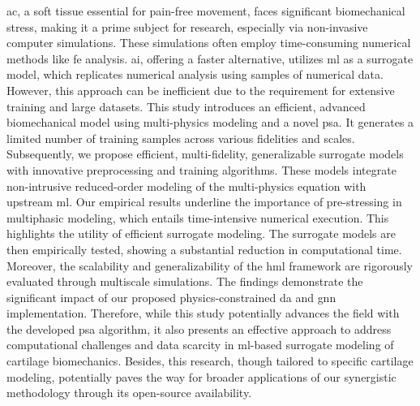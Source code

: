 \Ac{ac}, a soft tissue essential for pain-free movement, faces significant biomechanical stress, making it a prime subject for research, especially via non-invasive computer simulations. These simulations often employ time-consuming numerical methods like \ac{fe} analysis. \Ac{ai}, offering a faster alternative, utilizes \ac{ml} as a surrogate model, which replicates numerical analysis using samples of numerical data. However, this approach can be inefficient due to the requirement for extensive training and large datasets. This study introduces an efficient, advanced biomechanical model using multi-physics modeling and a novel \ac{psa}. It generates a limited number of training samples across various fidelities and scales. Subsequently, we propose efficient, multi-fidelity, generalizable surrogate models with innovative preprocessing and training algorithms. These models integrate non-intrusive reduced-order modeling of the multi-physics equation with upstream \ac{ml}. Our empirical results underline the importance of pre-stressing in multiphasic modeling, which entails time-intensive numerical execution. This highlights the utility of efficient surrogate modeling. The surrogate models are then empirically tested, showing a substantial reduction in computational time. Moreover, the scalability and generalizability of the \ac{hml} framework are rigorously evaluated through multiscale simulations. The findings demonstrate the significant impact of our proposed physics-constrained \ac{da} and \ac{gnn} implementation. Therefore, while this study potentially advances the field with the developed \ac{psa} algorithm, it also presents an effective approach to address computational challenges and data scarcity in \ac{ml}-based surrogate modeling of cartilage biomechanics. Besides, this research, though tailored to specific cartilage modeling, potentially paves the way for broader applications of our synergistic methodology through its open-source availability.
